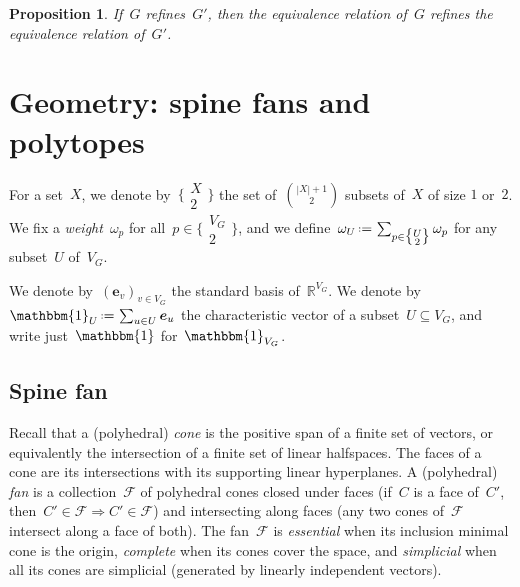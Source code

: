 \documentclass{amsart}
\newtheorem{proposition}[theorem]{Proposition}
\theoremstyle{definition}
\newcommand{\R}{\mathbb{R}} %
\renewcommand{\c}[1]{{\mathcal{#1}}} %
\renewcommand{\b}[1]{{\boldsymbol{#1}}} %
\newcommand{\bigset}[2]{\big\{ #1 \;\big|\; #2 \big\}} %
\newcommand{\dotprod}[2]{\langle \, #1 \; | \; #2 \, \rangle} %
\newcommand{\one}{\mathbbm{1}} %
\newcommand{\eqdef}{\mbox{\,\raisebox{0.2ex}{\scriptsize\ensuremath{\mathrm:}}\ensuremath{=}\,}} %
\newcommand{\eg}{\textit{e.g.}~} %
\newcommand{\darkblue}{\color{darkblue}} %
\newcommand{\defn}[1]{\textsl{\darkblue #1}} %
\newcommand{\weight}{\omega} %
\newcommand{\monombinom}[1]{\big\{\!\begin{smallmatrix} #1 \\ 2 \end{smallmatrix}\!\big\}}
\begin{document}
\begin{proposition}
  \label{prop:refinementSurjection}
  If~$G$ refines~$G'$, then the equivalence relation of~$G$ refines the equivalence relation of~$G'$.
\end{proposition}


\section{Geometry: spine fans and polytopes}

For a set~$X$, we denote by~$\monombinom{X}$ the set of~$\binom{|X|+1}{2}$ subsets of~$X$ of size $1$ or~$2$.
We fix a \defn{weight}~$\weight_p$ for all~$p \in \monombinom{V_G}$, and we define~$\weight_U \eqdef \sum_{p \in \monombinom{U}} \weight_p$ for any subset~$U$ of~$V_G$.

We denote by~$(\b{e}_v)_{v \in V_G}$ the standard basis of~$\R^{V_G}$.
We denote by~$\one_U \eqdef \sum_{u \in U} \b{e}_u$ the characteristic vector of a subset~$U \subseteq V_G$, and write just~$\one$ for~$\one_{V_G}$.


\subsection{Spine fan}

%
Recall that a (polyhedral) \defn{cone} is the positive span of a finite set of vectors, or equivalently the intersection of a finite set of linear halfspaces.
The faces of a cone are its intersections with its supporting linear hyperplanes.
A (polyhedral) \defn{fan} is a collection~$\c{F}$ of polyhedral cones closed under faces (if~$C$ is a face of~$C'$, then~$C' \in \c{F} \Rightarrow C' \in \c{F}$) and intersecting along faces (any two cones of~$\c{F}$ intersect along a face of both).
The fan~$\c{F}$ is \defn{essential} when its inclusion minimal cone is the origin, \defn{complete} when its cones cover the space, and \defn{simplicial} when all its cones are simplicial (generated by linearly independent vectors).
\end{document}
